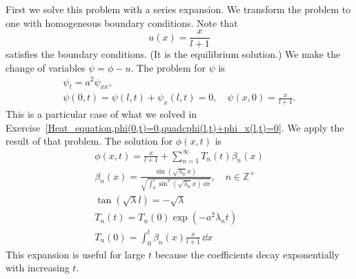 {%
\begin{Solution}
  \label{solution heat radiation bc 2 series solutions}
  First we solve this problem with a series expansion.  We transform the
  problem to one with homogeneous boundary conditions.  Note that
  \[
  u(x) = \frac{ x }{l + 1}
  \] 
  satisfies the boundary conditions.  (It is the equilibrium solution.)
  We make the change of variables
  $\psi = \phi - u$.   The problem for $\psi$ is
  \begin{gather*}
    \psi_t = a^2 \psi_{xx}, \\
    \psi(0,t) = \psi(l,t) + \psi_x(l,t) = 0, \quad \psi(x,0) = \frac{ x }{l + 1}.
  \end{gather*}
  This is a particular case of what we solved in 
  Exercise~\ref{Heat_equation,phi(0,t)=0,quadcphi(l,t)+phi_x(l,t)=0}.
  We apply the result of that problem.  The solution for $\phi(x,t)$ is
  \begin{gather*}
    \phi(x,t) = \frac{ x }{l + 1} + \sum_{n=1}^\infty T_n(t) \beta_n(x) \\
    \beta_n(x) = \frac{ \sin \left( \sqrt{\lambda_n} x \right) }
    { \sqrt{ \int_0^l \sin^2 \left( \sqrt{ \lambda_n } x 
        \right) \,\dd x } }, \quad n \in \mathbb{Z}^+ \\
    \tan \left( \sqrt{\lambda} l \right) = - \sqrt{\lambda} \\
    T_n(t) = T_n(0) \exp \left( - a^2 \lambda_n t \right) \\
    T_n(0) = \int_0^l \beta_n(x) \frac{ x }{l + 1} \,\dd x
  \end{gather*}
  This expansion is useful for large $t$ because the coefficients decay
  exponentially with increasing $t$.


\end{Solution}}
